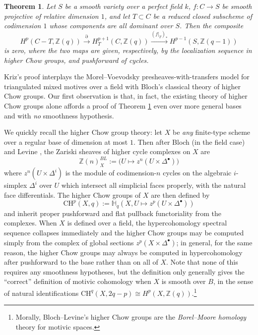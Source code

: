\documentclass[a4paper,reqno,11pt]{amsart}
\theoremstyle{plain}
\newtheorem{theorem}{Theorem}[section]
\theoremstyle{definition}
\theoremstyle{remark}
\newcommand{\CH}{{\mathrm{CH}}}
\newcommand{\Z}{\mathbb{Z}}
\begin{document}
\begin{theorem} \label{thm:kriz}
    Let $S$ be a smooth variety over a perfect field $k$, $f:C\to S$ be smooth projective of relative dimension $1$, and let $T\subset C$ be a reduced closed subscheme of codimension $1$ whose components are all dominant over $S$. Then the composite
    \[
    H^p(C-T, \Z(q)) \xrightarrow{\partial} H^{p+1}_T(C, \Z(q)) \xrightarrow{(f|_T)_*} H^{p-1}(S, \Z(q-1))
    \]
    is zero, where the two maps are given, respectively, by the localization sequence in higher Chow groups, and pushforward of cycles.
\end{theorem}

Kriz's proof interplays the Morel--Voevodsky presheaves-with-transfers model for triangulated mixed motives over a field with Bloch's classical theory of higher Chow groups. Our first observation is that, in fact, the existing theory of higher Chow groups alone affords a proof of Theorem \ref{thm:kriz} even over more general bases and with \emph{no} smoothness hypothesis.

We quickly recall the higher Chow group theory: let $X$ be \emph{any} finite-type scheme over a regular base of dimension at most $1$. Then after Bloch \cite{B} (in the field case) and Levine \cite{L2}, the Zariski sheaves of higher cycle complexes on $X$ are
\[
    \Z(n)^{BL}_{X} := \bigl(U\mapsto z^n(U\times \Delta^\bullet)\bigr)
\]
where $z^n(U\times \Delta^i)$ is the module of codimension-$n$ cycles on the algebraic $i$-simplex $\Delta^i$ over $U$ which intersect all simplicial faces properly, with the natural face differentials. The higher Chow groups of $X$ are then defined by
\[
\CH^p(X, q) := \mathbb{H}_q(X, U\mapsto z^p(U\times \Delta^\bullet))
\]
and inherit proper pushforward and flat pullback functoriality from the complexes. When $X$ is defined over a field, the hypercohomology spectral sequence collapses immediately and the higher Chow groups may be computed simply from the complex of global sections $z^p(X\times \Delta^\bullet)$; in general, for the same reason, the higher Chow groups may always be computed in hypercohomology after pushforward to the base rather than on all of $X$. Note that none of this requires any smoothness hypotheses, but the definition only generally gives the ``correct'' definition of motivic cohomology when $X$ is smooth over $B$, in the sense of natural identifications $\CH^q(X, 2q-p)\cong H^p(X,\Z(q))$.\footnote{Morally, Bloch--Levine's higher Chow groups are the \emph{Borel--Moore homology} theory for motivic spaces.}
\end{document}
